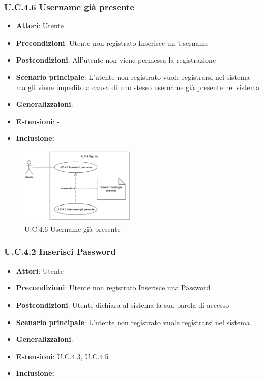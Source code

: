 \subsubsection{U.C.4.6 Username già presente}
\begin{itemize}
    \item \textbf{Attori}: Utente
    \item \textbf{Precondizioni}: Utente non registrato Inserisce un Username
    \item \textbf{Postcondizioni}: All'utente non viene permessa la registrazione
    \item \textbf{Scenario principale}: L’utente non registrato vuole registrarsi nel sistema ma gli viene impedito a causa di uno stesso username già presente nel sistema
    \item \textbf{Generalizzaioni}: -
    \item \textbf{Estensioni}: -
    \item \textbf{Inclusione:} -
\end{itemize}
\begin{figure}[h!]
    \centering
    \includegraphics[width=0.5\textwidth]{img/UC4-6.png}
    \caption{U.C.4.6 Username già presente}
\end{figure}
\subsubsection{U.C.4.2 Inserisci Password}
\begin{itemize}
    \item \textbf{Attori}: Utente
    \item \textbf{Precondizioni}: Utente non registrato Inserisce una Password
    \item \textbf{Postcondizioni}: Utente dichiara al sistema la sua parola di accesso
    \item \textbf{Scenario principale}: L’utente non registrato vuole registrarsi nel sistema
    \item \textbf{Generalizzaioni}: -
    \item \textbf{Estensioni}: U.C.4.3, U.C.4.5
    \item \textbf{Inclusione:} -
\end{itemize}
